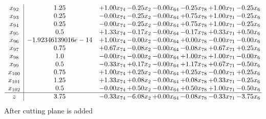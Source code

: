 \documentclass[8pt]{article}
\begin{document}
\[\begin{array}{c| c c@{\hskip 2pt} c@{\hskip 2pt} c@{\hskip 2pt} c@{\hskip 2pt} c@{\hskip 2pt} c@{\hskip 2pt} }
 x_{92}   &  1.25 & +  1.00 x_{74} & -0.25 x_{2} & -0.00 x_{64} & -0.25 x_{78} & +  1.00 x_{71} & -0.25 x_{6}\\
 x_{93}   &  0.25 & -0.00 x_{74} & -0.25 x_{2} & -0.00 x_{64} & +  0.75 x_{78} & +  1.00 x_{71} & -0.25 x_{6}\\
 x_{94}   &  0.25 & -0.00 x_{74} & -0.25 x_{2} & -0.00 x_{64} & +  0.75 x_{78} & +  1.00 x_{71} & -0.25 x_{6}\\
 x_{95}   &  0.5 & +  1.33 x_{74} & -0.17 x_{2} & -0.00 x_{64} & -0.17 x_{78} & +  0.33 x_{71} & +  0.50 x_{6}\\
 x_{96}   &  -1.92346139016e-14 & +  1.00 x_{74} & -0.00 x_{2} & -0.00 x_{64} & +  0.00 x_{78} & -0.00 x_{71} & -0.00 x_{6}\\
 x_{97}   &  0.75 & +  0.67 x_{74} & -0.08 x_{2} & -0.00 x_{64} & -0.08 x_{78} & +  0.67 x_{71} & +  0.25 x_{6}\\
 x_{98}   &  1.0 & -0.00 x_{74} & -0.00 x_{2} & -0.00 x_{64} & +  1.00 x_{78} & +  1.00 x_{71} & -0.00 x_{6}\\
 x_{99}   &  0.5 & -0.33 x_{74} & +  0.17 x_{2} & -0.00 x_{64} & +  1.17 x_{78} & +  0.67 x_{71} & -0.50 x_{6}\\
 x_{100}   &  0.75 & +  1.00 x_{74} & +  0.25 x_{2} & -0.00 x_{64} & +  0.25 x_{78} & -0.00 x_{71} & +  0.25 x_{6}\\
 x_{101}   &  1.25 & +  1.33 x_{74} & +  0.08 x_{2} & -0.00 x_{64} & +  0.08 x_{78} & +  0.33 x_{71} & -0.25 x_{6}\\
 x_{102}   &  0.5 & -0.00 x_{74} & +  0.50 x_{2} & -0.00 x_{64} & +  0.50 x_{78} & +  1.00 x_{71} & -0.50 x_{6}\\
\hline
z    &  3.75 & -0.33 x_{74} & -6.08 x_{2} & +  0.00 x_{64} & -0.08 x_{78} & -0.33 x_{71} & -3.75 x_{6}\\
\end{array}\]
 After cutting plane is added 
\end{document}
